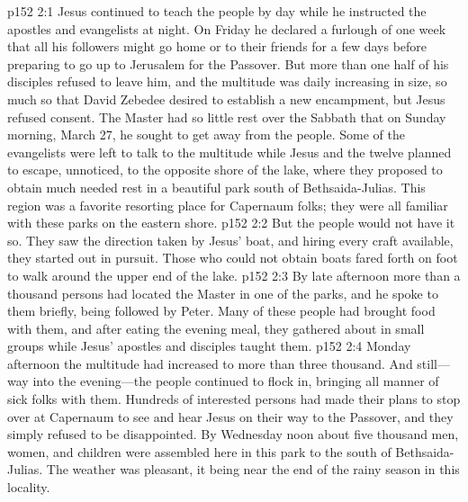 \vs p152 2:1 Jesus continued to teach the people by day while he instructed the apostles and evangelists at night. On Friday he declared a furlough of one week that all his followers might go home or to their friends for a few days before preparing to go up to Jerusalem for the Passover. But more than one half of his disciples refused to leave him, and the multitude was daily increasing in size, so much so that David Zebedee desired to establish a new encampment, but Jesus refused consent. The Master had so little rest over the Sabbath that on Sunday morning, March 27, he sought to get away from the people. Some of the evangelists were left to talk to the multitude while Jesus and the twelve planned to escape, unnoticed, to the opposite shore of the lake, where they proposed to obtain much needed rest in a beautiful park south of Bethsaida\hyp{}Julias. This region was a favorite resorting place for Capernaum folks; they were all familiar with these parks on the eastern shore.\plusone
\vs p152 2:2 But the people would not have it so. They saw the direction taken by Jesus’ boat, and hiring every craft available, they started out in pursuit. Those who could not obtain boats fared forth on foot to walk around the upper end of the lake.
\vs p152 2:3 By late afternoon more than a thousand persons had located the Master in one of the parks, and he spoke to them briefly, being followed by Peter. Many of these people had brought food with them, and after eating the evening meal, they gathered about in small groups while Jesus’ apostles and disciples taught them.
\vs p152 2:4 Monday afternoon the multitude had increased to more than three thousand. And still---way into the evening---the people continued to flock in, bringing all manner of sick folks with them. Hundreds of interested persons had made their plans to stop over at Capernaum to see and hear Jesus on their way to the Passover, and they simply refused to be disappointed. By Wednesday noon about five thousand men, women, and children were assembled here in this park to the south of Bethsaida\hyp{}Julias. The weather was pleasant, it being near the end of the rainy season in this locality.
